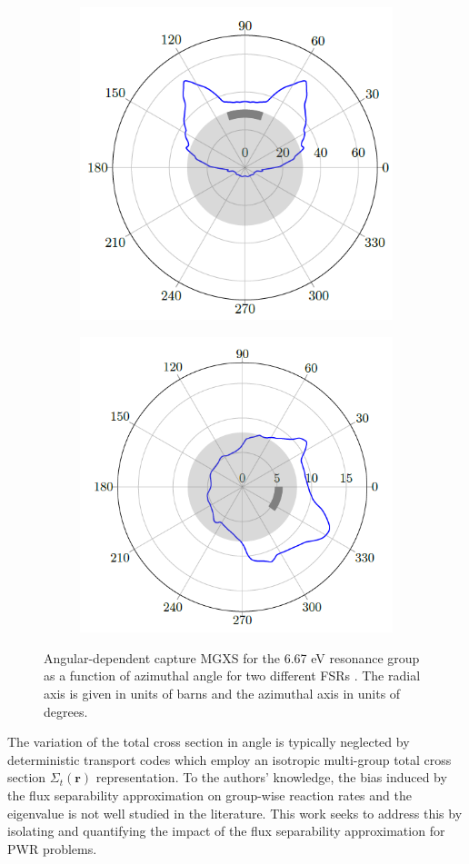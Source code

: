 \begin{figure}[hb!]
\begin{subfigure}{.45\textwidth}
  \centering
  \includegraphics[width=0.8\linewidth]{figures/batman-1}
  \caption{}
  \label{fig:batman-plots-a}
\end{subfigure}
\begin{subfigure}{.45\textwidth}
  \centering
  \includegraphics[width=0.8\linewidth]{figures/batman-2}
  \caption{}
  \label{fig:batman-plots-b}
\end{subfigure}
\caption{Angular-dependent capture MGXS for the 6.67 eV resonance group as a function of azimuthal angle for two different FSRs \citep{gibson2016thesis}. The radial axis is given in units of barns and the azimuthal axis in units of degrees.}
\label{fig:batman-plots}
\end{figure}

The variation of the total cross section in angle is typically neglected by deterministic transport codes which employ an isotropic multi-group total cross section $\Sigma_{t}(\mathbf{r})$ representation. To the authors' knowledge, the bias induced by the flux separability approximation on group-wise reaction rates and the eigenvalue is not well studied in the literature. This work seeks to address this by isolating and quantifying the impact of the flux separability approximation for PWR problems.